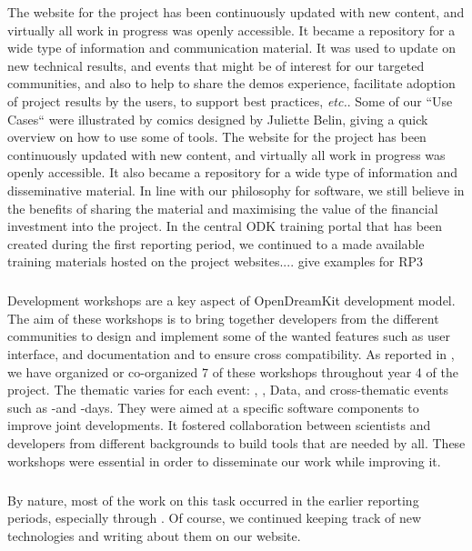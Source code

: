 The website for the project has been continuously updated with new content, and virtually all work in progress was openly accessible. It  became  a  repository  for  a  wide  type  of information and communication material. It was used to update on new technical results, and events that might be of interest for our targeted communities, and also to help to share the demos experience, facilitate adoption of project results by the users, to support best practices, \emph{etc.}.
Some of our ``Use Cases`` were illustrated by comics designed by
Juliette Belin, giving a quick overview on how to use some of \ODK
tools.
The website for the project has been continuously updated with new content, and virtually all work in progress was openly accessible. It  also  became  a  repository  for  a  wide  type  of information and disseminative material.  In line with our philosophy for software, we still believe in the benefits of sharing the material and maximising the value of the financial investment into the project. In the central ODK training portal that has been created during the first reporting period, we continued to a made available training materials hosted on the project websites.... give examples for RP3
\subparagraph{}
\label{dissem@devel-workshops}

Development workshops are a key aspect of OpenDreamKit development model. The aim of these workshops is to bring together developers from the different communities to design and implement some
of the wanted features such as user interface, and documentation and to ensure cross compatibility.
As reported in , we have organized
or co-organized 7  of these workshops throughout year 4 of the project. The thematic varies
for each event: \PariGP, \Linbox, Data, and cross-thematic events such as \GAP-\Sage and \GAP-\Singular days. They were aimed at a specific software components to improve joint developments. It fostered collaboration between scientists and developers from different backgrounds to build tools that are needed by all. These workshops were essential in order to disseminate our work while improving it.

\subparagraph{}

By nature, most of the work on this task occurred in the earlier
reporting periods, especially through .
Of course, we continued keeping track of new technologies and writing
about them on our website.

